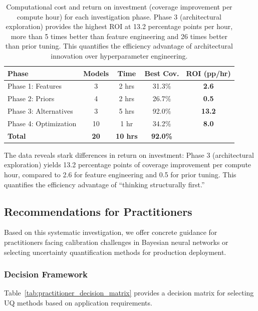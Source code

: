 \begin{table}[t]
\centering
\small
\begin{tabular}{@{}lcccc@{}}
\toprule
\textbf{Phase}  & \textbf{Models}  & \textbf{Time}  & \textbf{Best Cov.}  & \textbf{ROI (pp/hr)} \\
\midrule
Phase 1: Features & 3 & 2 hrs & 31.3\% & \textbf{2.6} \\
Phase 2: Priors & 4 & 2 hrs & 26.7\% & \textbf{0.5} \\
Phase 3: Alternatives & 3 & 5 hrs & 92.0\% & \textbf{13.2} \\
Phase 4: Optimization & 10 & 1 hr & 34.2\% & \textbf{8.0} \\
\midrule
\textbf{Total} & \textbf{20} & \textbf{10 hrs} & \textbf{92.0\%} & \\
\bottomrule
\end{tabular}
\caption{Computational cost and return on investment (coverage improvement per compute hour) for each investigation phase. Phase 3 (architectural exploration) provides the highest ROI at 13.2 percentage points per hour, more than 5 times better than feature engineering and 26 times better than prior tuning. This quantifies the efficiency advantage of architectural innovation over hyperparameter engineering.}
\label{tab:computational_cost_summary}
\end{table}

The data reveals stark differences in return on investment: Phase 3 (architectural exploration) yields 13.2 percentage points of coverage improvement per compute hour, compared to 2.6 for feature engineering and 0.5 for prior tuning. This quantifies the efficiency advantage of ``thinking structurally first.''

\subsection{Recommendations for Practitioners}
\label{subsec:recommendations}

Based on this systematic investigation, we offer concrete guidance for practitioners facing calibration challenges in Bayesian neural networks or selecting uncertainty quantification methods for production deployment.

\subsubsection{Decision Framework}

Table~\ref{tab:practitioner_decision_matrix} provides a decision matrix for selecting UQ methods based on application requirements.

